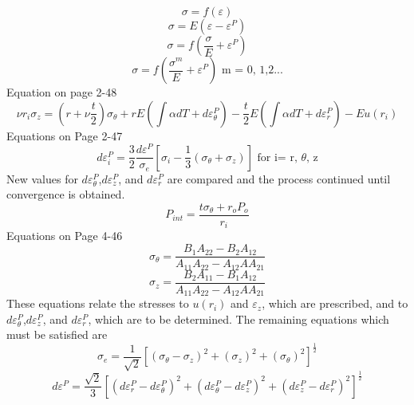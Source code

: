 \documentclass[12pt]{article}
\begin{document}
\begin{equation}
\sigma=f(\varepsilon)
\end{equation}
\begin{equation}
\sigma=E(\varepsilon-\varepsilon^P)
\end{equation}
\begin{equation}
\sigma=f \left( \frac{\sigma}{E}+\varepsilon^P \right)
\end{equation}
\begin{equation}
\sigma=f \left( \frac{\sigma^m}{E}+\varepsilon^P \right) \text{ m = 0, 1,2...}
\end{equation}
Equation on page 2-48
\begin{equation}
\nu r_i \sigma_z=\left(r+\nu \frac{t}{2} \right) \sigma_{\theta}+rE \left( \int \alpha dT+d \varepsilon_{\theta}^P \right)-\frac{t}{2}E \left( \int \alpha dT+d \varepsilon_r^P \right)-Eu(r_i)
\end{equation}
Equations on Page 2-47
\begin{equation}
d \varepsilon_i^P=\frac{3}{2} \frac{d \varepsilon^P}{\sigma_e} \left[ \sigma_i- \frac{1}{3} \left( \sigma_{\theta}+\sigma_z \right) \right] \text{ for i= r, }\theta \text{, z}
\end{equation}
New values for $ d \varepsilon_{\theta}^P $,$ d \varepsilon_{z}^P $, and $ d \varepsilon_{r}^P $ are compared and the process continued until convergence is obtained. 
\begin{equation}
P_{int}=\frac{t\sigma_{\theta}+r_{o}P_{o}}{r_i}
\end{equation}
Equations on Page 4-46
\begin{equation}
\sigma_{\theta}=\frac{B_{1}A_{22}-B_{2}A_{12}}{A_{11}A_{22}-A_{12}AA_{21}}
\end{equation}
\begin{equation}
\sigma_{z}=\frac{B_{2}A_{11}-B_{1}A_{12}}{A_{11}A_{22}-A_{12}AA_{21}}
\end{equation}
These equations relate the stresses to $ u(r_i)$ and $\varepsilon_z $, which are prescribed, and to $ d \varepsilon_{\theta}^P $,$ d \varepsilon_{z}^P $, and $ d \varepsilon_{r}^P $, which are to be determined. The remaining equations which must be satisfied are
\begin{equation}
\sigma_e=\frac{1}{\sqrt{2}} \left[ (\sigma_{\theta}-\sigma_{z})^2+(\sigma_{z})^2+(\sigma_{\theta})^2 \right] ^{\frac{1}{2}}
\end{equation}
\begin{equation}
d \varepsilon^P=\frac{\sqrt{2}}{3} \left[ (d \varepsilon_{r}^{P}-d \varepsilon_{\theta}^{P})^2+(d \varepsilon_{\theta}^{P}-d \varepsilon_{z}^{P})^2+(d \varepsilon_{z}^{P}-d \varepsilon_{r}^{P})^2 \right] ^{\frac{1}{2}}
\end{equation}
\end{document}
